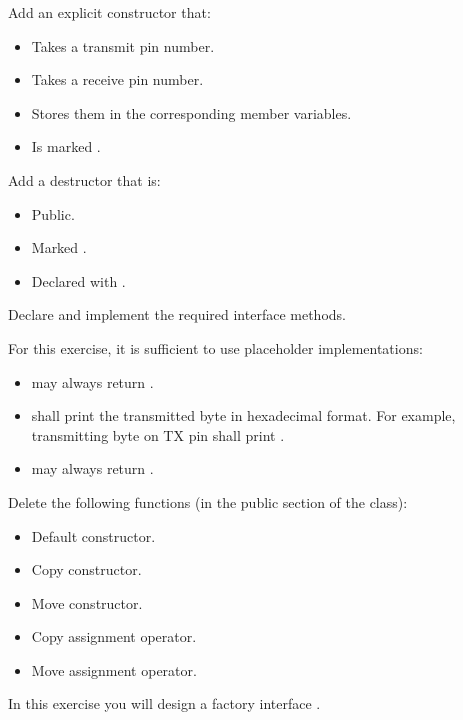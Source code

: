 Add an explicit constructor that:
\begin{itemize}
  \item Takes a transmit pin number.
  \item Takes a receive pin number.
  \item Stores them in the corresponding member variables.
  \item Is marked .
\end{itemize}

Add a destructor that is:
\begin{itemize}
  \item Public.
  \item Marked .
  \item Declared with .
\end{itemize}

Declare and implement the required interface methods.

For this exercise, it is sufficient to use placeholder implementations:
\begin{itemize}
  \item {} may always return .
  \item {} shall print the transmitted byte in hexadecimal format. For example,
    transmitting byte  on TX pin  shall print
    .
  \item {} may always return .
\end{itemize}

Delete the following functions (in the public section of the class):
\begin{itemize}
  \item Default constructor.
  \item Copy constructor.
  \item Move constructor.
  \item Copy assignment operator.
  \item Move assignment operator.
\end{itemize}

\label{c4:set:2}

\label{c4:ex:2.1}
In this exercise you will design a factory interface .

